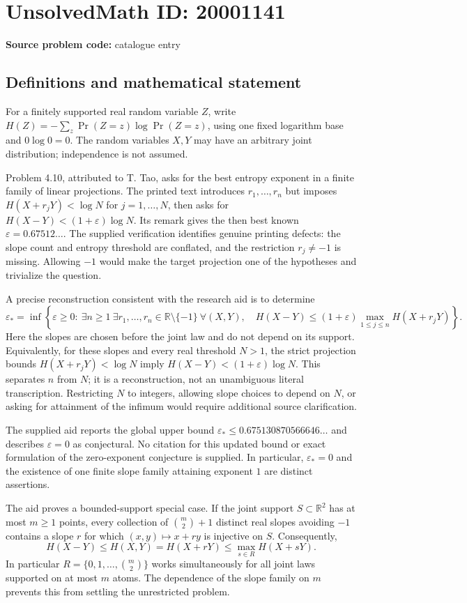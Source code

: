 \documentclass[11pt]{article}
\newcommand{\R}{\mathbb{R}}
\begin{document}
\section*{UnsolvedMath ID: 20001141}
\textbf{Source problem code:} catalogue entry
\subsection{Definitions and mathematical statement}
For a finitely supported real random variable \(Z\), write \(H(Z)=-\sum_z\Pr(Z=z)\log\Pr(Z=z)\), using one fixed logarithm base and \(0\log0=0\). The random variables \(X,Y\) may have an arbitrary joint distribution; independence is not assumed.

Problem 4.10, attributed to T. Tao, asks for the best entropy exponent in a finite family of linear projections. The printed text introduces \(r_1,\ldots,r_n\) but imposes \(H(X+r_jY)<\log N\) for \(j=1,\ldots,N\), then asks for \(H(X-Y)<(1+\varepsilon)\log N\). Its remark gives the then best known \(\varepsilon=0.67512\ldots\). The supplied verification identifies genuine printing defects: the slope count and entropy threshold are conflated, and the restriction \(r_j\ne-1\) is missing. Allowing \(-1\) would make the target projection one of the hypotheses and trivialize the question.

A precise reconstruction consistent with the research aid is to determine
\[
\varepsilon_* =\inf\left\{\varepsilon\ge0:\ \exists n\ge1\ \exists r_1,\ldots,r_n\in\R\setminus\{-1\}\ \forall(X,Y),\quad H(X-Y)\le(1+\varepsilon)\max_{1\le j\le n}H(X+r_jY)\right\}.
\]
Here the slopes are chosen before the joint law and do not depend on its support. Equivalently, for these slopes and every real threshold \(N>1\), the strict projection bounds \(H(X+r_jY)<\log N\) imply \(H(X-Y)<(1+\varepsilon)\log N\). This separates \(n\) from \(N\); it is a reconstruction, not an unambiguous literal transcription. Restricting \(N\) to integers, allowing slope choices to depend on \(N\), or asking for attainment of the infimum would require additional source clarification.

The supplied aid reports the global upper bound \(\varepsilon_*\le0.675130870566646\ldots\) and describes \(\varepsilon=0\) as conjectural. No citation for this updated bound or exact formulation of the zero-exponent conjecture is supplied. In particular, \(\varepsilon_*=0\) and the existence of one finite slope family attaining exponent \(1\) are distinct assertions.

The aid proves a bounded-support special case. If the joint support \(S\subset\R^2\) has at most \(m\ge1\) points, every collection of \(\binom m2+1\) distinct real slopes avoiding \(-1\) contains a slope \(r\) for which \((x,y)\mapsto x+ry\) is injective on \(S\). Consequently,
\[
H(X-Y)\le H(X,Y)=H(X+rY)\le\max_{s\in R}H(X+sY).
\]
In particular \(R=\{0,1,\ldots,\binom m2\}\) works simultaneously for all joint laws supported on at most \(m\) atoms. The dependence of the slope family on \(m\) prevents this from settling the unrestricted problem.
\end{document}
